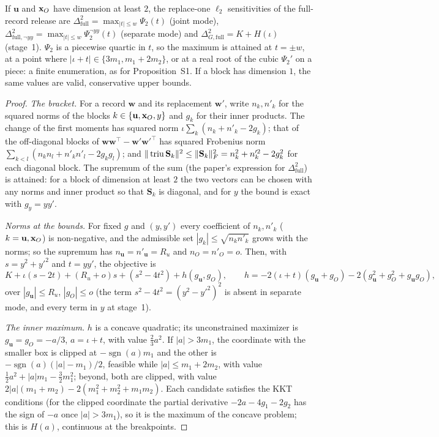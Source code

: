 \begin{theorem}\label{thm:S10c}
If $\mathbf u$ and $\mathbf{x}_O$ have dimension at least $2$, the replace-one $\ell_2$ sensitivities of the full-record release are $\Delta_{\mathrm{full}}^2=\max_{|t|\le w}\Psi_2(t)$ (joint mode), $\Delta^2_{\mathrm{full},\neg yy}=\max_{|t|\le w}\Psi_2^{\neg yy}(t)$ (separate mode) and $\Delta_{G,\mathrm{full}}^2=K+H(\iota)$ (stage~1). $\Psi_2$ is a piecewise quartic in $t$, so the maximum is attained at $t=\pm w$, at a point where $|\iota+t|\in\{3m_1,m_1+2m_2\}$, or at a real root of the cubic $\Psi_2'$ on a piece: a finite enumeration, as for Proposition~S1. If a block has dimension $1$, the same values are valid, conservative upper bounds.
\end{theorem}
\begin{proof}
\emph{The bracket.} For a record $\mathbf w$ and its replacement $\mathbf w'$, write $n_k,n'_k$ for the squared norms of the blocks $k\in\{\mathbf u,\mathbf{x}_O,y\}$ and $g_k$ for their inner products. The change of the first moments has squared norm $\iota\sum_k(n_k+n'_k-2g_k)$; that of the off-diagonal blocks of $\mathbf w\mathbf w^\top-\mathbf w'\mathbf w'^\top$ has squared Frobenius norm $\sum_{k<l}(n_kn_l+n'_kn'_l-2g_kg_l)$; and $\|\operatorname{triu}\mathbf S_k\|^2\le\|\mathbf S_k\|_F^2=n_k^2+n_k'^2-2g_k^2$ for each diagonal block. The supremum of the sum (the paper's expression for $\Delta^2_{\mathrm{full}}$) is attained: for a block of dimension at least $2$ the two vectors can be chosen with any norms and inner product so that $\mathbf S_k$ is diagonal, and for $y$ the bound is exact with $g_y=yy'$.

\emph{Norms at the bounds.} For fixed $g$ and $(y,y')$ every coefficient of $n_k,n'_k$ ($k=\mathbf u,\mathbf{x}_O$) is non-negative, and the admissible set $|g_k|\le\sqrt{n_kn'_k}$ grows with the norms; so the supremum has $n_{\mathbf u}=n'_{\mathbf u}=R_u$ and $n_O=n'_O=o$. Then, with $s=y^2+y'^2$ and $t=yy'$, the objective is
\[
  K+\iota(s-2t)+(R_u+o)s+(s^2-4t^2)+h(g_{\mathbf u},g_O),\qquad h=-2(\iota+t)(g_{\mathbf u}+g_O)-2(g_{\mathbf u}^2+g_O^2+g_{\mathbf u}g_O),
\]
over $|g_{\mathbf u}|\le R_u$, $|g_O|\le o$ (the term $s^2-4t^2=(y^2-y'^2)^2$ is absent in separate mode, and every term in $y$ at stage~1).

\emph{The inner maximum.} $h$ is a concave quadratic; its unconstrained maximizer is $g_{\mathbf u}=g_O=-a/3$, $a=\iota+t$, with value $\tfrac23a^2$. If $|a|>3m_1$, the coordinate with the smaller box is clipped at $-\operatorname{sgn}(a)m_1$ and the other is $-\operatorname{sgn}(a)(|a|-m_1)/2$, feasible while $|a|\le m_1+2m_2$, with value $\tfrac12a^2+|a|m_1-\tfrac32m_1^2$; beyond, both are clipped, with value $2|a|(m_1+m_2)-2(m_1^2+m_2^2+m_1m_2)$. Each candidate satisfies the KKT conditions (for the clipped coordinate the partial derivative $-2a-4g_1-2g_2$ has the sign of $-a$ once $|a|>3m_1$), so it is the maximum of the concave problem; this is $H(a)$, continuous at the breakpoints.


\end{proof}
